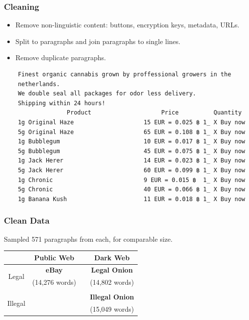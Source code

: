 \documentclass[t,xcolor={svgnames,table}]{beamer}
\begin{document}
\begin{frame}[fragile]
	\frametitle{Cleaning}
	\begin{itemize}\setlength\itemsep{1em}
	\item Remove non-linguistic content: buttons, encryption keys, metadata, URLs.
	
	\item Split to paragraphs and join paragraphs to single lines.
	
	\item Remove duplicate paragraphs.
	\end{itemize}
	\scriptsize
\begin{verbatim}
	Finest organic cannabis grown by proffessional growers in the
	netherlands.
	We double seal all packages for odor less delivery.
	Shipping within 24 hours!
	              Product                    Price          Quantity
	1g Original Haze                    15 EUR = 0.025 ฿ 1_ X Buy now
	5g Original Haze                    65 EUR = 0.108 ฿ 1_ X Buy now
	1g Bubblegum                        10 EUR = 0.017 ฿ 1_ X Buy now
	5g Bubblegum                        45 EUR = 0.075 ฿ 1_ X Buy now
	1g Jack Herer                       14 EUR = 0.023 ฿ 1_ X Buy now
	5g Jack Herer                       60 EUR = 0.099 ฿ 1_ X Buy now
	1g Chronic                          9 EUR = 0.015 ฿  1_ X Buy now
	5g Chronic                          40 EUR = 0.066 ฿ 1_ X Buy now
	1g Banana Kush                      11 EUR = 0.018 ฿ 1_ X Buy now
\end{verbatim}
\end{frame}

\begin{frame}
	\frametitle{Clean Data}

	Sampled 571 paragraphs from each, for comparable size.
	
	\begin{center}
	\def\arraystretch{2}
	\begin{tabular}{c|ccc}
	& Public Web && Dark Web \\ 
	\hline
	\multirow{2}{*}{Legal} & \textbf{\color{yellow} eBay} && \textbf{\color{green} Legal Onion} \\
	& (14,276 words) && (14,802 words) \\\\
	\multirow{2}{*}{Illegal} &&& \textbf{\color{red} Illegal Onion} \\
	&&& (15,049 words)
	\end{tabular}
	\end{center}
\end{frame}
\end{document}
